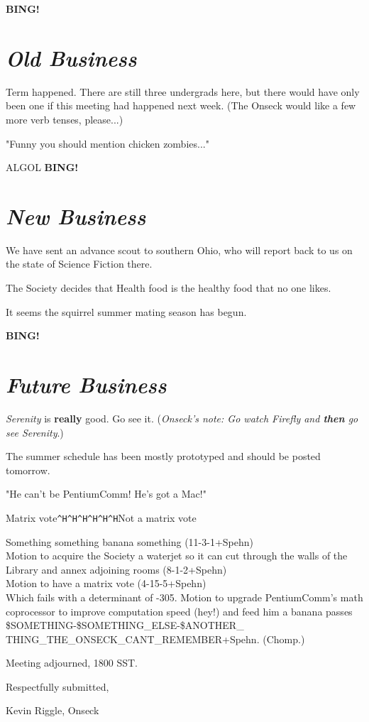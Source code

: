 \documentclass[10pt]{article}
\newcommand{\bing}{{\bf BING!} }
\newcommand{\goto}[1]{\bing \vskip 12pt \section*{{\em{#1}}}}
\begin{document}
\goto{Old Business}

Term happened.  There are still three undergrads here, but there would
have only been one if this meeting had happened next week.  (The Onseck
would like a few more verb tenses, please...)

"Funny you should mention chicken zombies..."

ALGOL
\goto{New Business}

We have sent an advance scout to southern Ohio, who will report back
to us on the state of Science Fiction there.

The Society decides that Health food is the healthy food that no one
likes.

It seems the squirrel summer mating season has begun.

\goto{Future Business}

{\em Serenity} is {\bf really} good.  Go see it.  ({\em Onseck's note:
Go watch {\em Firefly} and {\bf then} go see {\em Serenity}}.)

The summer schedule has been mostly prototyped and should be posted
tomorrow.

"He can't be PentiumComm!  He's got a Mac!"

Matrix vote{\tt ^H^H^H^H^H^H}Not a matrix vote

Something something banana something (11-3-1+Spehn)\\
Motion to acquire the Society a waterjet so it can cut through the
walls of the Library and annex adjoining rooms (8-1-2+Spehn)\\
Motion to have a matrix vote (4-15-5+Spehn)\\

Which fails with a determinant of -305.  Motion to upgrade 
PentiumComm's math coprocessor to improve computation speed (hey!)
and feed him a banana passes \$SOMETHING-\$SOMETHING_ELSE-\$ANOTHER_
THING_THE_ONSECK_CANT_REMEMBER+Spehn.  (Chomp.)
\vspace{12pt}

\noindent
Meeting adjourned, 1800 SST.

\vspace{18pt}

\centerline{Respectfully submitted,}
\centerline{Kevin Riggle, Onseck}
\end{document}
